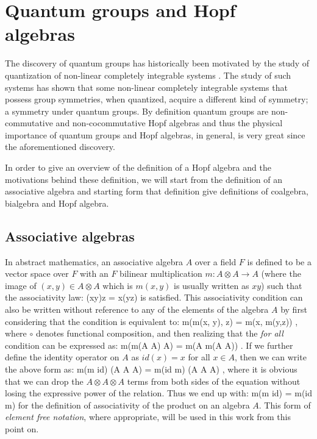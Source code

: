 \section{Quantum groups and Hopf algebras}


The discovery of quantum groups has historically been motivated by the study
of quantization of non-linear completely integrable systems \cite{sklyanin}. The study of
such systems has shown that some non-linear completely integrable systems that
possess group symmetries, when quantized, acquire a different kind of symmetry;
a symmetry under quantum groups. By definition quantum groups are non-commutative and
non-cocommutative Hopf algebras and thus the physical importance of quantum groups and
Hopf algebras, in general, is very great since the aforementioned discovery.


In order to give an overview of the definition of a Hopf algebra and the motivations
behind these definition, we will start from the definition of an associative algebra
and starting form that definition give definitions of coalgebra, bialgebra and Hopf
algebra.


\subsection{Associative algebras}
In abstract mathematics, an associative algebra $A$ over a field $F$ is
defined to be a vector space over
$F$ with an $F$ bilinear multiplication $m: A \otimes A \rightarrow A$ (where the image of
$(x, y) \in A \otimes A$ which is $m(x,y)$ is usually written as $xy$) such that the associativity
law:
\beq
(xy)z = x(yz) \quad {}
\eeq
is satisfied. This associativity condition can also be written without reference to any of
the elements of the algebra $A$ by first considering that the condition is equivalent to:
\beq
m\circ(m(x, y), z) = m\circ(x, m(y,z)) \quad {},
\eeq
where $\circ$ denotes functional composition,
and then realizing that the {\it for all} condition can be expressed as:
\beq
m\circ(m(A \otimes A) \otimes A) = m\circ(A \otimes m(A \otimes A)) \quad .
\eeq
If we further define the identity operator on $A$ as $id(x) = x$
for all $x \in A$, then we can write the above form as:
\beq
m\circ(m \otimes id) (A \otimes A \otimes A) = m\circ(id \otimes m) (A \otimes A \otimes A) \quad ,
\eeq
where it is obvious that we can drop the $A \otimes A \otimes A$ terms from both sides
of the equation without losing the expressive power of the relation. Thus we end up with:
\beq
m\circ(m \otimes id) = m\circ(id \otimes m)
\eeq
for the definition of associativity of the product on an algebra $A$. This form of {\it element free
notation}, where appropriate, will be used in this work from this point on.


